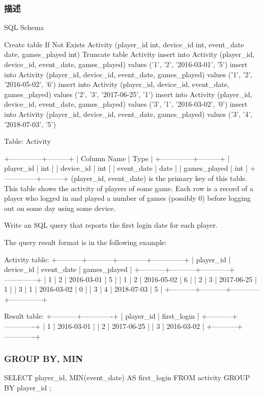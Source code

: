 \subsubsection{描述}
SQL Schema

\begin{Code}
Create table If Not Exists Activity (player_id int, device_id int, event_date date, games_played int)
Truncate table Activity
insert into Activity (player_id, device_id, event_date, games_played) values ('1', '2', '2016-03-01', '5')
insert into Activity (player_id, device_id, event_date, games_played) values ('1', '2', '2016-05-02', '6')
insert into Activity (player_id, device_id, event_date, games_played) values ('2', '3', '2017-06-25', '1')
insert into Activity (player_id, device_id, event_date, games_played) values ('3', '1', '2016-03-02', '0')
insert into Activity (player_id, device_id, event_date, games_played) values ('3', '4', '2018-07-03', '5')
\end{Code}

Table: Activity

\begin{Code}
+--------------+---------+
| Column Name  | Type    |
+--------------+---------+
| player_id    | int     |
| device_id    | int     |
| event_date   | date    |
| games_played | int     |
+--------------+---------+
(player_id, event_date) is the primary key of this table.
This table shows the activity of players of some game.
Each row is a record of a player who logged in and played a number of games (possibly 0) before logging out on some day using some device.
\end{Code}

Write an SQL query that reports the first login date for each player.

The query result format is in the following example:

\begin{Code}
Activity table:
+-----------+-----------+------------+--------------+
| player_id | device_id | event_date | games_played |
+-----------+-----------+------------+--------------+
| 1         | 2         | 2016-03-01 | 5            |
| 1         | 2         | 2016-05-02 | 6            |
| 2         | 3         | 2017-06-25 | 1            |
| 3         | 1         | 2016-03-02 | 0            |
| 3         | 4         | 2018-07-03 | 5            |
+-----------+-----------+------------+--------------+

Result table:
+-----------+-------------+
| player_id | first_login |
+-----------+-------------+
| 1         | 2016-03-01  |
| 2         | 2017-06-25  |
| 3         | 2016-03-02  |
+-----------+-------------+
\end{Code}


\subsubsection{GROUP BY, MIN}
\begin{Code}
SELECT
    player_id,
    MIN(event_date) AS first_login
FROM
    activity
GROUP BY
    player_id
;
\end{Code}

